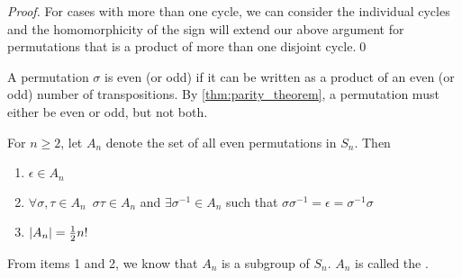 \begin{proof}
  For cases with more than one cycle, we can consider the individual cycles and the homomorphicity of the sign will extend our above argument for permutations that is a product of more than one disjoint cycle.\qed
\end{proof}

\begin{defn}\label{defn:odd_and_even_permutations}
  A permutation $\sigma$ is even (or odd) if it can be written as a product of an even (or odd) number of transpositions. By \autoref{thm:parity_theorem}, a permutation must either be even or odd, but not both.
\end{defn}

\begin{thm}\label{thm:alternating_group}
  For $n \geq 2$, let $A_n$ denote the set of all even permutations in $S_n$. Then
  \begin{enumerate}
    \item $\epsilon \in A_n$
    \item $\forall \sigma, \tau \in A_n \enspace \sigma \tau \in A_n$ and $\exists \sigma^{-1} \in A_n$ such that $\sigma \sigma^{-1} = \epsilon = \sigma^{-1} \sigma$
    \item $\left|A_n\right| = \frac{1}{2} n!$
  \end{enumerate}
\end{thm}

\begin{note}
  From items 1 and 2, we know that $A_n$ is a subgroup of $S_n$. $A_n$ is called the .
\end{note}

